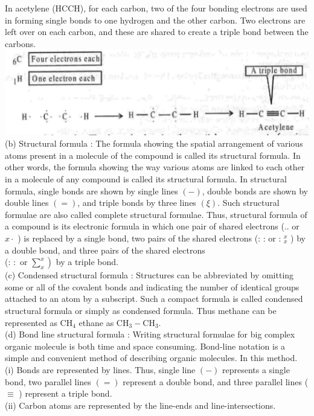 \documentclass[10pt]{article}
\begin{document}
In acetylene (HCCH), for each carbon, two of the four bonding electrons are used in forming single bonds to one hydrogen and the other carbon. Two electrons are left over on each carbon, and these are shared to create a triple bond between the carbons.\\
\includegraphics[max width=\textwidth, center]{2025_01_28_8470952b98110cec3aabg-006}\\
(b) Structural formula : The formula showing the spatial arrangement of various atoms present in a molecule of the compound is called its structural formula. In other words, the formula showing the way various atoms are linked to each other in a molecule of any compound is called its structural formula. In structural formula, single bonds are shown by single lines $(-)$, double bonds are shown by double lines $(=)$, and triple bonds by three lines $(\xi)$. Such structural formulae are also called complete structural formulae. Thus, structural formula of a compound is its electronic formula in which one pair of shared electrons (.. or $x \cdot$ ) is replaced by a single bond, two pairs of the shared electrons (: : or : ${ }_{x}^{x}$ ) by a double bond, and three pairs of the shared electrons\\
(: $:$ or $\left.\sum_{x}^{x}\right)$ by a triple bond.\\
(c) Condensed structural formula : Structures can be abbreviated by omitting some or all of the covalent bonds and indicating the number of identical groups attached to an atom by a subscript. Such a compact formula is called condensed structural formula or simply as condensed formula. Thus methane can be represented as $\mathrm{CH}_{4}$ ethane as $\mathrm{CH}_{3}-\mathrm{CH}_{3}$.\\
(d) Bond line structural formula : Writing structural formulae for big complex organic molecule is both time and space consuming. Bond-line notation is a simple and convenient method of describing organic molecules. In this method.\\
(i) Bonds are represented by lines. Thus, single line $(-)$ represents a single bond, two parallel lines $(=)$ represent a double bond, and three parallel lines ( $\equiv$ ) represent a triple bond.\\
(ii) Carbon atoms are represented by the line-ends and line-intersections.
\end{document}
